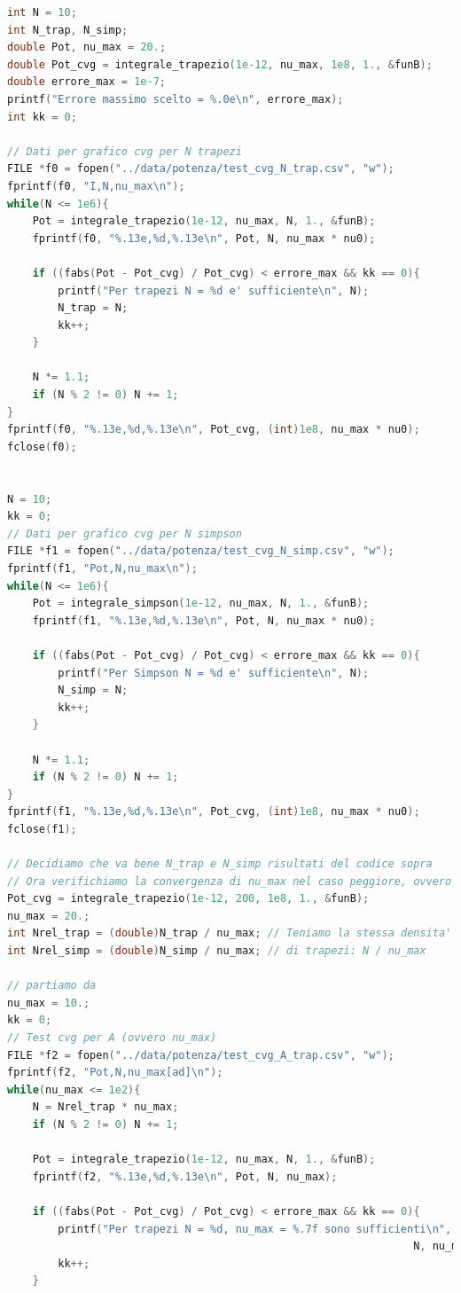 \documentclass[a4paper, titlepage]{article}
\begin{document}
\begin{lstlisting}[language=C]
int N = 10;
int N_trap, N_simp;
double Pot, nu_max = 20.;
double Pot_cvg = integrale_trapezio(1e-12, nu_max, 1e8, 1., &funB);
double errore_max = 1e-7;
printf("Errore massimo scelto = %.0e\n", errore_max);
int kk = 0;

// Dati per grafico cvg per N trapezi
FILE *f0 = fopen("../data/potenza/test_cvg_N_trap.csv", "w");
fprintf(f0, "I,N,nu_max\n");
while(N <= 1e6){
    Pot = integrale_trapezio(1e-12, nu_max, N, 1., &funB);
    fprintf(f0, "%.13e,%d,%.13e\n", Pot, N, nu_max * nu0);

    if ((fabs(Pot - Pot_cvg) / Pot_cvg) < errore_max && kk == 0){
        printf("Per trapezi N = %d e' sufficiente\n", N);
        N_trap = N;
        kk++;
    }

    N *= 1.1;
    if (N % 2 != 0) N += 1;
}
fprintf(f0, "%.13e,%d,%.13e\n", Pot_cvg, (int)1e8, nu_max * nu0);
fclose(f0);


N = 10;
kk = 0;
// Dati per grafico cvg per N simpson
FILE *f1 = fopen("../data/potenza/test_cvg_N_simp.csv", "w");
fprintf(f1, "Pot,N,nu_max\n");
while(N <= 1e6){
    Pot = integrale_simpson(1e-12, nu_max, N, 1., &funB);
    fprintf(f1, "%.13e,%d,%.13e\n", Pot, N, nu_max * nu0);

    if ((fabs(Pot - Pot_cvg) / Pot_cvg) < errore_max && kk == 0){
        printf("Per Simpson N = %d e' sufficiente\n", N);
        N_simp = N;
        kk++;
    }

    N *= 1.1;
    if (N % 2 != 0) N += 1;
}
fprintf(f1, "%.13e,%d,%.13e\n", Pot_cvg, (int)1e8, nu_max * nu0);
fclose(f1);

// Decidiamo che va bene N_trap e N_simp risultati del codice sopra
// Ora verifichiamo la convergenza di nu_max nel caso peggiore, ovvero
Pot_cvg = integrale_trapezio(1e-12, 200, 1e8, 1., &funB);
nu_max = 20.;
int Nrel_trap = (double)N_trap / nu_max; // Teniamo la stessa densita'
int Nrel_simp = (double)N_simp / nu_max; // di trapezi: N / nu_max

// partiamo da
nu_max = 10.;
kk = 0;
// Test cvg per A (ovvero nu_max)
FILE *f2 = fopen("../data/potenza/test_cvg_A_trap.csv", "w");
fprintf(f2, "Pot,N,nu_max[ad]\n");
while(nu_max <= 1e2){
    N = Nrel_trap * nu_max;
    if (N % 2 != 0) N += 1;

    Pot = integrale_trapezio(1e-12, nu_max, N, 1., &funB);
    fprintf(f2, "%.13e,%d,%.13e\n", Pot, N, nu_max);

    if ((fabs(Pot - Pot_cvg) / Pot_cvg) < errore_max && kk == 0){
        printf("Per trapezi N = %d, nu_max = %.7f sono sufficienti\n",
                                                                N, nu_max);
        kk++;
    }


\end{lstlisting}
\end{document}
